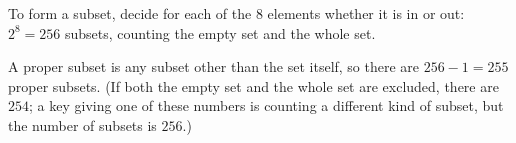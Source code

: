 To form a subset, decide for each of the $8$ elements whether it is in or out: $2^8=\boxed{256}$ subsets, counting the empty set and the whole set.

A proper subset is any subset other than the set itself, so there are $256-1=\boxed{255}$ proper subsets. (If both the empty set and the whole set are excluded, there are $254$; a key giving one of these numbers is counting a different kind of subset, but the number of subsets is $256$.)
